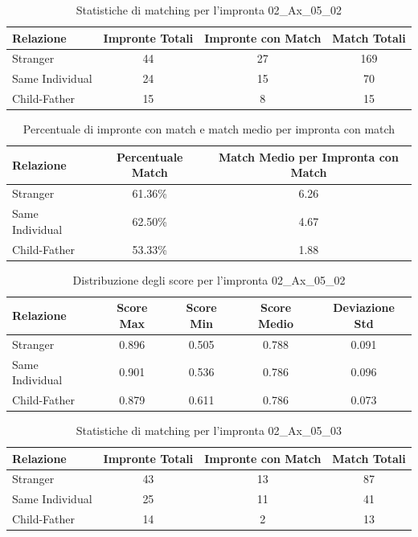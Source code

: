 \begin{table}[htbp]
\centering
\caption{Statistiche di matching per l'impronta 02\_Ax\_05\_02}
\label{tab:results_02_Ax_05_02}
\begin{tabular}{|l|c|c|c|}
\hline
\textbf{Relazione} & \textbf{Impronte Totali} & \textbf{Impronte con Match} & \textbf{Match Totali} \\
\hline
Stranger & 44 & 27 & 169 \\
\hline
Same Individual & 24 & 15 & 70 \\
\hline
Child-Father & 15 & 8 & 15 \\
\hline
\end{tabular}
\end{table}


\begin{table}[htbp]
\centering
\caption{Percentuale di impronte con match e match medio per impronta con match}
\label{tab:match_percentage_02_Ax_05_02}
\begin{tabular}{|l|c|c|}
\hline
\textbf{Relazione} & \textbf{Percentuale Match} & \textbf{Match Medio per Impronta con Match} \\
\hline
Stranger & 61.36\% & 6.26 \\
\hline
Same Individual & 62.50\% & 4.67 \\
\hline
Child-Father & 53.33\% & 1.88 \\
\hline
\end{tabular}
\end{table}


\begin{table}[htbp]
\centering
\caption{Distribuzione degli score per l'impronta 02\_Ax\_05\_02}
\label{tab:scores_02_Ax_05_02}
\begin{tabular}{|l|c|c|c|c|}
\hline
\textbf{Relazione} & \textbf{Score Max} & \textbf{Score Min} & \textbf{Score Medio} & \textbf{Deviazione Std} \\
\hline
Stranger & 0.896 & 0.505 & 0.788 & 0.091 \\
\hline
Same Individual & 0.901 & 0.536 & 0.786 & 0.096 \\
\hline
Child-Father & 0.879 & 0.611 & 0.786 & 0.073 \\
\hline
\end{tabular}
\end{table}


\begin{table}[htbp]
\centering
\caption{Statistiche di matching per l'impronta 02\_Ax\_05\_03}
\label{tab:results_02_Ax_05_03}
\begin{tabular}{|l|c|c|c|}
\hline
\textbf{Relazione} & \textbf{Impronte Totali} & \textbf{Impronte con Match} & \textbf{Match Totali} \\
\hline
Stranger & 43 & 13 & 87 \\
\hline
Same Individual & 25 & 11 & 41 \\
\hline
Child-Father & 14 & 2 & 13 \\
\hline
\end{tabular}
\end{table}


